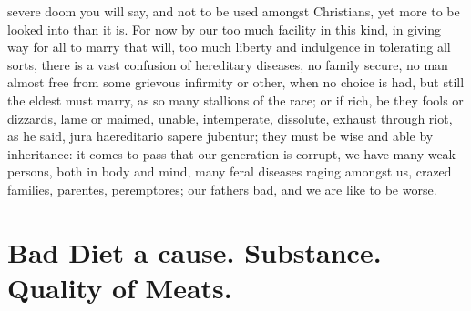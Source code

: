 {severe doom you will say, and not to be used amongst Christians, yet
more to be looked into than it is. For now by our too much facility in
this kind, in giving way for all to marry that will, too much liberty
and indulgence in tolerating all sorts, there is a vast confusion of
hereditary diseases, no family secure, no man almost free from some
grievous infirmity or other, when no choice is had, but still the
eldest must marry, as so many stallions of the race; or if rich, be
they fools or dizzards, lame or maimed, unable, intemperate, dissolute,
exhaust through riot, as he said, jura haereditario sapere
jubentur; they must be wise and able by inheritance: it comes to pass
that our generation is corrupt, we have many weak persons, both in body
and mind, many feral diseases raging amongst us, crazed families,
parentes, peremptores; our fathers bad, and we are like to be worse.


\section[Bad Diet]{Bad Diet a cause. Substance. Quality of Meats.}

}
